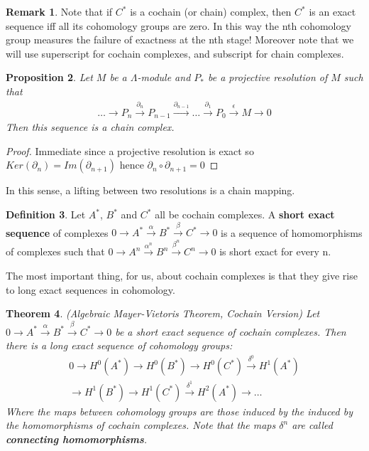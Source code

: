 \documentclass[12pt]{book}
\newtheorem{theorem}{Theorem}[chapter]
\newtheorem{proposition}[theorem]{Proposition}
\theoremstyle{definition}
\newtheorem{definition}[theorem]{Definition}
\newtheorem{remark}[theorem]{Remark}
\begin{document}
\begin{remark}
    Note that if $C^*$ is a cochain (or chain) complex, then $C^*$ is an exact sequence iff all its cohomology groups are zero. In this way the nth cohomology group measures the failure of exactness at the nth stage! Moreover note that we will use superscript for cochain complexes, and subscript for chain complexes. 
\end{remark}

\begin{proposition}
    Let $M$ be a $\Lambda$-module and $P_*$ be a projective resolution of $M$ such that
    \begin{align*}
        \dots \rightarrow P_n \xrightarrow{\partial_n} P_{n-1} \xrightarrow{\partial_{n-1}} \dots \xrightarrow{\partial_1} P_0 \xrightarrow{\epsilon} M \rightarrow 0
    \end{align*}
    Then this sequence is a chain complex.
\end{proposition}
\begin{proof}
    Immediate since a projective resolution is exact so $Ker(\partial_n) = Im(\partial_{n+1})$ hence $\partial_n \circ \partial_{n+1} = 0$ 
\end{proof}
In this sense, a lifting between two resolutions is a chain mapping.
\begin{definition}
    Let $A^*$, $B^*$ and $C^*$ all be cochain complexes. A \textbf{short exact sequence} of complexes $0 \rightarrow A^* \xrightarrow{\alpha} B^* \xrightarrow{\beta} C^* \rightarrow 0$ is a sequence of homomorphisms of complexes such that $0 \rightarrow A^n \xrightarrow{\alpha^n} B^n \xrightarrow{\beta^n} C^n \rightarrow 0$ is short exact for every n. 
\end{definition}

The most important thing, for us, about cochain complexes is that they give rise to long exact sequences in cohomology. 

\begin{theorem}(Algebraic Mayer-Vietoris Theorem, Cochain Version)
    Let $0 \rightarrow A^* \xrightarrow{\alpha} B^* \xrightarrow{\beta} C^* \rightarrow 0$  be a short exact sequence of cochain complexes. Then there is a long exact sequence of cohomology groups: 
    \begin{align*}
        0 \rightarrow H^0(A^*) \rightarrow H^0(B^*) \rightarrow H^0(C^*) \xrightarrow{\delta^0} H^1(A^*)\\
        \rightarrow H^1(B^*) \rightarrow H^1(C^*) \xrightarrow{\delta^1} H^2(A^*) \rightarrow \dots 
    \end{align*}
    Where the maps between cohomology groups are those induced by the induced by the homomorphisms of cochain complexes. Note that the maps $\delta^n$ are called \textbf{connecting homomorphisms}.
\end{theorem}
\end{document}
